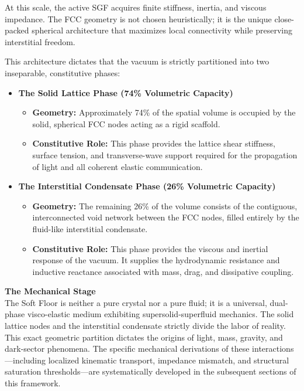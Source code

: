 At this scale, the active SGF acquires finite stiffness, inertia, and viscous impedance. The FCC geometry is not chosen heuristically; it is the unique close-packed spherical architecture that maximizes local connectivity while preserving interstitial freedom.

This architecture dictates that the vacuum is strictly partitioned into two inseparable, constitutive phases:
\begin{itemize}
    \item \textbf{The Solid Lattice Phase (74\% Volumetric Capacity)}
    \begin{itemize}
        \item \textbf{Geometry:} Approximately 74\% of the spatial volume is occupied by the solid, spherical FCC nodes acting as a rigid scaffold.
        \item \textbf{Constitutive Role:} This phase provides the lattice shear stiffness, surface tension, and transverse-wave support required for the propagation of light and all coherent elastic communication.
    \end{itemize}
    \item \textbf{The Interstitial Condensate Phase (26\% Volumetric Capacity)}
    \begin{itemize}
        \item \textbf{Geometry:} The remaining 26\% of the volume consists of the contiguous, interconnected void network between the FCC nodes, filled entirely by the fluid-like interstitial condensate.
        \item \textbf{Constitutive Role:} This phase provides the viscous and inertial response of the vacuum. It supplies the hydrodynamic resistance and inductive reactance associated with mass, drag, and dissipative coupling.
    \end{itemize}
\end{itemize}

\textbf{The Mechanical Stage}\\
The Soft Floor is neither a pure crystal nor a pure fluid; it is a universal, dual-phase visco-elastic medium exhibiting supersolid-superfluid mechanics. The solid lattice nodes and the interstitial condensate strictly divide the labor of reality. This exact geometric partition dictates the origins of light, mass, gravity, and dark-sector phenomena. The specific mechanical derivations of these interactions---including localized kinematic transport, impedance mismatch, and structural saturation thresholds---are systematically developed in the subsequent sections of this framework.

